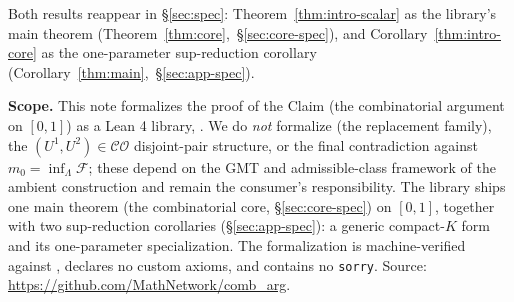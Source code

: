 Both results reappear in §\ref{sec:spec}:
Theorem~\ref{thm:intro-scalar} as the library's main theorem
(Theorem~\ref{thm:core},~\S\ref{sec:core-spec}), and
Corollary~\ref{thm:intro-core} as the one-parameter sup-reduction
corollary (Corollary~\ref{thm:main},~\S\ref{sec:app-spec}).

\textbf{Scope.} This note formalizes the proof of the Claim
(the combinatorial argument on $[0,1]$) as a Lean 4 library,
\CombArg. We do \emph{not}
formalize \cite[Lemma~3.1]{DLT13} (the replacement family), the
$(U^1, U^2) \in \mathcal{CO}$ disjoint-pair structure, or the
final contradiction against $m_0 = \inf_\Lambda \mathcal{F}$;
these depend on the GMT and admissible-class framework of the
ambient construction and remain the consumer's responsibility.
The library ships one main theorem (the combinatorial core,
§\ref{sec:core-spec}) on $[0,1]$, together with two
sup-reduction corollaries (§\ref{sec:app-spec}): a generic
compact-$K$ form and its one-parameter specialization. The
formalization is machine-verified against \Mathlib, declares no
custom axioms, and contains no \texttt{sorry}. Source:
\url{https://github.com/MathNetwork/comb_arg}.

